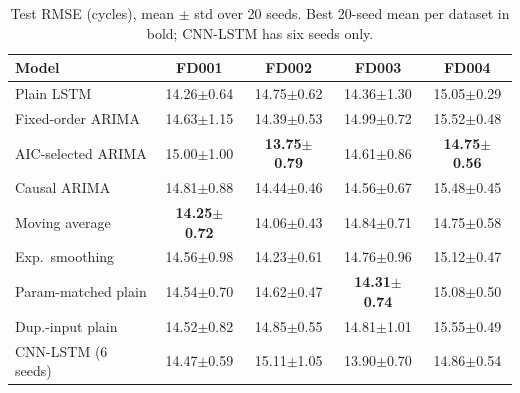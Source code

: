 \documentclass[conference]{IEEEtran}
\begin{document}
\begin{table}[t]
\centering
\caption{Test RMSE (cycles), mean $\pm$ std over 20 seeds. Best 20-seed mean per dataset in bold; CNN-LSTM has six seeds only.}
\label{tab:means}
\footnotesize
\setlength{\tabcolsep}{2.5pt}
\begin{tabular}{lcccc}
\toprule
Model & FD001 & FD002 & FD003 & FD004 \\
\midrule
Plain LSTM & 14.26{\tiny$\pm$0.64} & 14.75{\tiny$\pm$0.62} & 14.36{\tiny$\pm$1.30} & 15.05{\tiny$\pm$0.29} \\
Fixed-order ARIMA & 14.63{\tiny$\pm$1.15} & 14.39{\tiny$\pm$0.53} & 14.99{\tiny$\pm$0.72} & 15.52{\tiny$\pm$0.48} \\
AIC-selected ARIMA & 15.00{\tiny$\pm$1.00} & \textbf{13.75{\tiny$\pm$0.79}} & 14.61{\tiny$\pm$0.86} & \textbf{14.75{\tiny$\pm$0.56}} \\
Causal ARIMA & 14.81{\tiny$\pm$0.88} & 14.44{\tiny$\pm$0.46} & 14.56{\tiny$\pm$0.67} & 15.48{\tiny$\pm$0.45} \\
Moving average & \textbf{14.25{\tiny$\pm$0.72}} & 14.06{\tiny$\pm$0.43} & 14.84{\tiny$\pm$0.71} & 14.75{\tiny$\pm$0.58} \\
Exp.\ smoothing & 14.56{\tiny$\pm$0.98} & 14.23{\tiny$\pm$0.61} & 14.76{\tiny$\pm$0.96} & 15.12{\tiny$\pm$0.47} \\
Param-matched plain & 14.54{\tiny$\pm$0.70} & 14.62{\tiny$\pm$0.47} & \textbf{14.31{\tiny$\pm$0.74}} & 15.08{\tiny$\pm$0.50} \\
Dup.-input plain & 14.52{\tiny$\pm$0.82} & 14.85{\tiny$\pm$0.55} & 14.81{\tiny$\pm$1.01} & 15.55{\tiny$\pm$0.49} \\
CNN-LSTM (6 seeds) & 14.47{\tiny$\pm$0.59} & 15.11{\tiny$\pm$1.05} & 13.90{\tiny$\pm$0.70} & 14.86{\tiny$\pm$0.54} \\
\bottomrule
\end{tabular}
\end{table}
\end{document}
